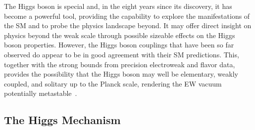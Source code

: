 The Higgs boson is special and, in the eight years since its discovery, it has become a powerful tool, providing the capability to explore the manifestations of the SM and to probe the physics landscape beyond.
It may offer direct insight on physics beyond the weak scale through possible sizeable effects on the Higgs boson properties.
However, the Higgs boson couplings that have been so far observed do appear to be in good agreement with their SM predictions.
This, together with the strong bounds from precision electroweak and flavor data, provides the possibility that the Higgs boson may well be elementary, weakly coupled, and solitary up to the Planck scale, rendering the EW vacuum potentially metastable~\cite{Degrassi:2012ry,Alekhin:2012py,Buttazzo:2013uya}.


\subsection{The Higgs Mechanism}
\label{sec:higgs_mech}

